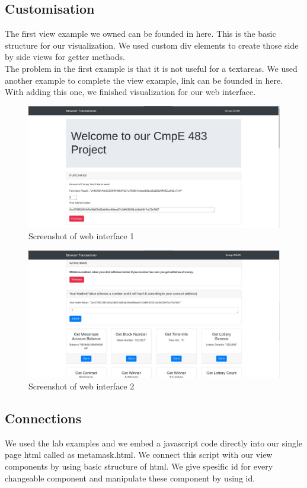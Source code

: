 \documentclass[]{scrreprt}
\begin{document}
		\subsection{Customisation}
		The first view example we owned can be founded in here\cite{1}. This is the basic structure for our visualization. We used custom div elements to create those side by side views for getter methods.\\
		The problem in the first example is that it is not useful for a textareas. We used another example to complete the view example, link can be founded in here\cite{2}. With adding this one, we finished visualization for our web interface.
				\begin{figure}[h!]
					\centering
					\includegraphics[scale=0.28]{12.jpeg}
					\caption{Screenshot of web interface 1}
				\end{figure}
					\begin{figure}[h!]
						\centering
						\includegraphics[scale=0.24]{11.jpeg}
						\caption{Screenshot of web interface 2}
					\end{figure}
		\subsection{Connections}
		We used the lab examples and we embed a javascript code directly into our single page html called as metamask.html. We connect this script with our view components by using basic structure of html. We give spesific id for every changeable component and manipulate these component by using id.
\end{document}
